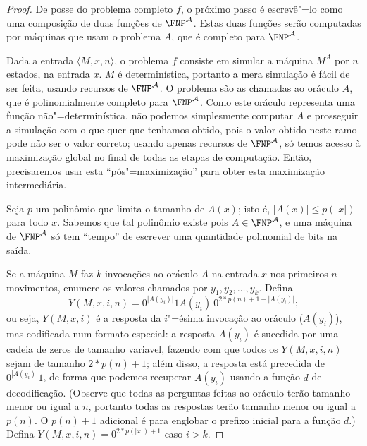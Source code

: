 \begin{proof}
    De posse do problema completo $f$,
    o próximo passo é escrevê"=lo como uma composição
    de duas funções de $\FNP^\mathcal A$.
    Estas duas funções serão computadas por máquinas
    que usam o problema $A$,
    que é completo para $\FNP^\mathcal A$.

    Dada a entrada $\langle M, x, n \rangle$,
    o problema $f$ consiste em simular a máquina $M^A$ por $n$ estados,
    na entrada $x$.
    $M$ é determinística, portanto a mera simulação é fácil de ser feita,
    usando recursos de $\FNP^\mathcal A$.
    O problema são as chamadas ao oráculo $A$,
    que é polinomialmente completo para $\FNP^\mathcal A$.
    Como este oráculo representa uma função não"=determinística,
    não podemos simplesmente computar $A$
    e prosseguir a simulação com o que quer que tenhamos obtido,
    pois o valor obtido neste ramo
    pode não ser o valor correto;
    usando apenas recursos de $\FNP^\mathcal A$,
    só temos acesso à maximização global
    no final de todas as etapas de computação.
    Então, precisaremos usar esta ``pós"=maximização''
    para obter esta maximização intermediária.

    Seja $p$ um polinômio que limita o tamanho de $A(x)$;
    isto é, $|A(x)| \leq p(|x|)$ para todo $x$.
    Sabemos que tal polinômio existe
    pois $A \in \FNP^\mathcal A$,
    e uma máquina de $\FNP^\mathcal A$ só tem ``tempo''
    de escrever uma quantidade polinomial de bits na saída.

    Se a máquina $M$ faz $k$ invocações ao oráculo $A$ na entrada $x$
    nos primeiros $n$ movimentos,
    enumere os valores chamados por $y_1, y_2, \dots, y_k$.
    Defina
    \begin{equation*}
        Y(M, x, i, n) = 0^{|A(y_i)|} 1 A(y_i)\ 0^{2*p(n)+1 - |A(y_i)|};
    \end{equation*}
    ou seja, $Y(M, x, i)$ é a resposta da $i$"=ésima invocação ao oráculo ($A(y_i)$),
    mas codificada num formato especial:
    a resposta $A(y_i)$ é sucedida por uma cadeia de zeros de tamanho variavel,
    fazendo com que todos os $Y(M, x, i, n)$ sejam de tamanho $2*p(n) + 1$;
    além disso, a resposta está precedida de $0^{|A(y_i)|}1$,
    de forma que podemos recuperar $A(y_i)$
    usando a função $d$ de decodificação.
    (Observe que todas as perguntas feitas ao oráculo
    terão tamanho menor ou igual a $n$,
    portanto todas as respostas terão tamanho menor ou igual a $p(n)$.
    O $p(n)+1$ adicional é para englobar o prefixo inicial para a função $d$.)
    Defina $Y(M, x, i, n) = 0^{2*p(|x|)+1}$ caso $i > k$.


\end{proof}
